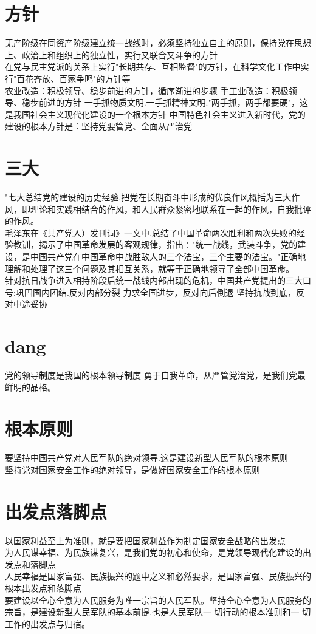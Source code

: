 \documentclass[11pt,a4paper,titlepage]{article}
\begin{document}
\section{方针}
无产阶级在同资产阶级建立统一战线时，必须坚持独立自主的原则，保持党在思想上、政治上和组织上的独立性，实行又联合又斗争的方针\\
在党与民主党派的关系上实行"长期共存、互相监督"的方针，在科学文化工作中实行"百花齐放、百家争鸣"的方针等\\
农业改造：积极领导、稳步前进的方针，循序渐进的步骤
手工业改造：积极领导、稳步前进的方针
一手抓物质文明.一手抓精神文明."两手抓，两手都要硬"，这是我国社会主义现代化建设的一个根本方针
中国特色社会主义进入新时代，党的建设的根本方针是：坚持党要管党、全面从严治党
\section{三大}
"七大总结党的建设的历史经验.把党在长期奋斗中形成的优良作风概括为三大作风，即理论和实践相结合的作风，和人民群众紧密地联系在一起的作风，自我批评的作风。\\
毛泽东在《共产党人）发刊词》一文中.总结了中国革命两次胜利和两次失败的经验教训，揭示了中国革命发展的客观规律，指出∶"统一战线，武装斗争，党的建设，是中国共产党在中国革命中战胜敌人的三个法宝，三个主要的法宝。"正确地理解和处理了这三个问题及其相互关系，就等于正确地领导了全部中国革命。\\
针对抗日战争进入相持阶段后统一战线内部出现的危机，中国共产党提出的三大口号:巩固国内团结.反对内部分裂 力求全国进步，反对向后倒退 坚持抗战到底，反对中途妥协\\
\section{dang}
党的领导制度是我国的根本领导制度
勇于自我革命，从严管党治党，是我们党最鲜明的品格。
\section{根本原则}
要坚持中国共产党对人民军队的绝对领导.这是建设新型人民军队的根本原则\\
坚持党对国家安全工作的绝对领导，是做好国家安全工作的根本原则\\
\section{出发点落脚点}
以国家利益至上为准则，就是要把国家利益作为制定国家安全战略的出发点\\
为人民谋幸福、为民族谋复兴，是我们党的初心和使命，是党领导现代化建设的出发点和落脚点\\
人民幸福是国家富强、民族振兴的题中之义和必然要求，是国家富强、民族振兴的根本出发点和落脚点\\
要建设以全心全意为人民服务为唯一宗旨的人民军队。坚持全心全意为人民服务的宗旨，是建设新型人民军队的基本前提.也是人民军队一-切行动的根本准则和一-切工作的出发点与归宿。\\
\end{document}

